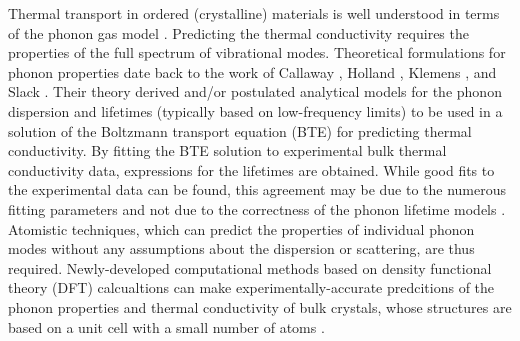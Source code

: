 Thermal transport in ordered (crystalline) materials is well understood 
in terms of the phonon gas model 
\cite{maradudin_dynamical_1974,wallace_thermodynamics_1972,
srivastava_physics_1990,dove_introduction_1993,ziman_electrons_2001}. 
Predicting the thermal conductivity requires the properties of the 
full spectrum of vibrational modes. 
Theoretical formulations for phonon properties date back to the work of 
Callaway \cite{callaway_model_1959}, 
Holland \cite{holland_analysis_1963}, 
Klemens \cite{klemens_scattering_1955}, 
and Slack \cite{slack_thermal_1979}. Their theory derived and/or 
postulated analytical models for the phonon dispersion and lifetimes 
(typically based on low-frequency limits) to be used in a solution 
of the Boltzmann transport equation (BTE) for predicting thermal conductivity. 
By fitting the
BTE solution to experimental bulk thermal conductivity data, expressions 
for the lifetimes are obtained. While good fits to the experimental 
data can be found, this agreement may be due to the numerous fitting 
parameters and not due to the correctness of the phonon lifetime models 
\cite{chung_role_2004}. 
Atomistic techniques, which can predict the properties of individual phonon
modes without any assumptions about the dispersion or scattering, 
are thus required. Newly-developed computational methods based on 
density functional theory (DFT) 
calcualtions can make experimentally-accurate 
predcitions of the phonon properties and thermal conductivity of bulk 
crystals, whose structures are based on a unit cell with a small number of 
atoms \cite{broido_intrinsic_2007,ward_ab_2009,ward_intrinsic_2010,
esfarjani_heat_2011,lindsay_thermal_2012,shiga_microscopic_2012,
luckyanova_coherent_2012,lindsay_first-principles_2013}. 

